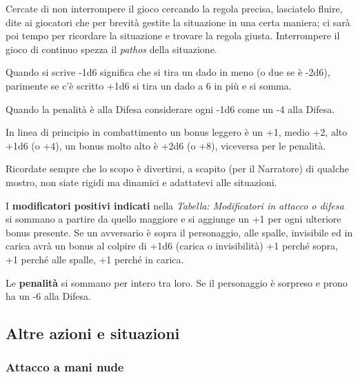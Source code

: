 \begin{multicols}{2}

\begin{narratore}
Cercate di non interrompere il gioco cercando la regola precisa, lasciatelo fluire, dite ai giocatori che per brevità gestite la situazione in una certa maniera; ci sarà poi tempo per ricordare la situazione e trovare la regola giusta. Interrompere il gioco di continuo spezza il \emph{pathos} della situazione.
\end{narratore}

Quando si scrive -1d6 significa che si tira un dado in meno (o due se è -2d6), parimente se c'è scritto +1d6 si tira un dado a 6 in più e si somma.

Quando la penalità è alla Difesa considerare ogni -1d6 come un -4 alla Difesa.

\medskip

In linea di principio in combattimento un bonus leggero è un +1, medio +2, alto +1d6 (o +4), un bonus molto alto è +2d6 (o +8), viceversa per le penalità.


\begin{narratore}
	Ricordate sempre che lo scopo è divertirsi, a scapito (per il Narratore) di qualche mostro, non siate rigidi ma dinamici e adattatevi alle situazioni.
\end{narratore}

I \textbf{modificatori positivi indicati} nella \emph{Tabella: Modificatori in attacco o difesa} si sommano a partire da quello maggiore e si aggiunge un +1 per ogni ulteriore bonus presente. Se un avversario è sopra il personaggio, alle spalle, invisibile ed in carica avrà un bonus al colpire di +1d6 (carica o invisibilità) +1 perché sopra, +1 perché alle spalle, +1 perché in carica.

Le \textbf{penalità} si sommano per intero tra loro. Se il personaggio è sorpreso e prono ha un -6 alla Difesa.


\subsection{Altre azioni e situazioni} \label{AltreAzioni}

\subsubsection{Attacco a mani nude}  \label{attaccomaninude}


\end{multicols}
